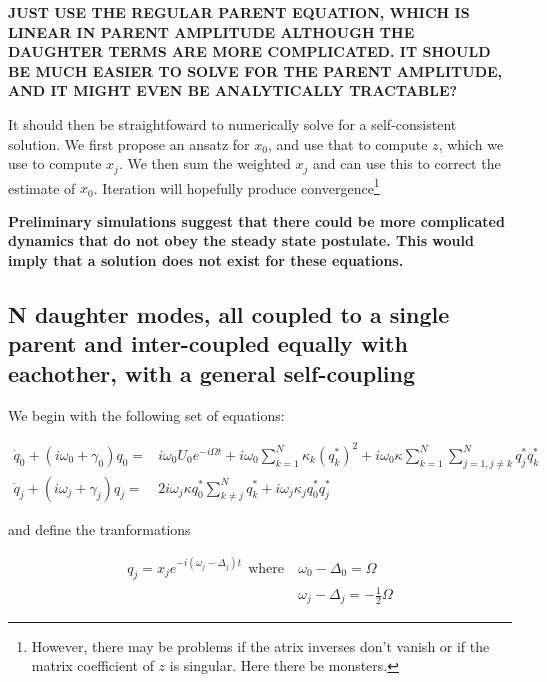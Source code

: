 \textbf{JUST USE THE REGULAR PARENT EQUATION, WHICH IS LINEAR IN PARENT AMPLITUDE ALTHOUGH THE DAUGHTER TERMS ARE MORE COMPLICATED. IT SHOULD BE MUCH EASIER TO SOLVE FOR THE PARENT AMPLITUDE, AND IT MIGHT EVEN BE ANALYTICALLY TRACTABLE?}

It should then be straightfoward to numerically solve for a self-consistent solution. We first propose an ansatz for $x_0$, and use that to compute $z$, which we use to compute $x_j$. We then sum the weighted $x_j$ and can use this to correct the estimate of $x_0$. Iteration will hopefully produce convergence\footnote{However, there may be problems if the atrix inverses don't vanish or if the matrix coefficient of $z$ is singular. Here there be monsters.}

\textbf{Preliminary simulations suggest that there could be more complicated dynamics that do not obey the steady state postulate. This would imply that a solution does not exist for these equations.}

\subsection*{N daughter modes, all coupled to a single parent and inter-coupled equally with eachother, with a general self-coupling}

We begin with the following set of equations:

\begin{subequations}
\begin{align}
\dot{q}_0 + (i\omega_0 + \gamma_0) q_0 = & i\omega_0 U_0 e^{-i\Omega t} + i\omega_0 \sum_{k=1}^{N} \kappa_k \left(q_k^\ast\right)^2 +i\omega_0 \kappa \sum_{k=1}^{N}\sum_{j=1, j\neq k}^{N} q_j^\ast q_k^\ast \\
\dot{q}_j + (i\omega_j + \gamma_j) q_j = & 2i\omega_j \kappa q_0^\ast \sum_{k\neq j}^{N} q_k^\ast + i\omega_j \kappa_j q_0^\ast q_j^\ast
\end{align}
\end{subequations}

and define the tranformations

\begin{subequations}
\begin{align}
q_j = x_j e^{-i(\omega_j - \Delta_j)t} \ \ \mathrm{where}\ & \omega_0 - \Delta_0 = \Omega \\
                                                           & \omega_j - \Delta_j = -\frac{1}{2}\Omega
\end{align}
\end{subequations}

